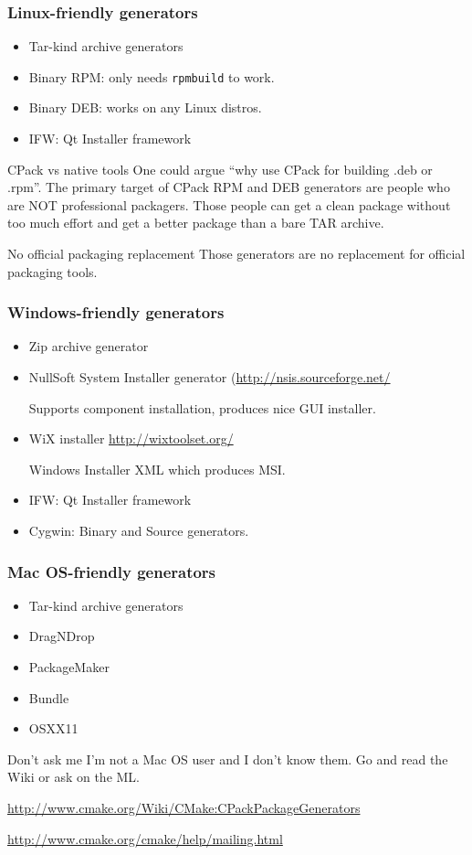 \documentclass[compress,slidestop,table
              ]
               {beamer}
\newcommand{\fname}[1]{\texttt{#1}}
\begin{document}
\begin{frame}
\frametitle{Linux-friendly generators}
\begin{itemize}
\item Tar-kind archive generators
\item Binary RPM: only needs \fname{rpmbuild} to work.
\item Binary DEB: works on any Linux distros.
\item IFW: Qt Installer framework
\end{itemize}
\begin{block}{CPack vs native tools}
One could argue ``why use CPack for building .deb or .rpm''.
The primary target of CPack RPM and DEB generators are people who are NOT
professional packagers.
Those people can get a clean package without too much effort and get
a better package than a bare TAR archive.
\end{block}
\begin{alertblock}{No official packaging replacement}
Those generators are \alert{no replacement} for official packaging tools.
\end{alertblock}
\end{frame}

\begin{frame}
\frametitle{Windows-friendly generators}
\begin{itemize}
\item Zip archive generator
\item NullSoft System Installer generator (\url{http://nsis.sourceforge.net/}

      Supports component installation, produces nice GUI installer.
\item WiX installer \url{http://wixtoolset.org/}

  Windows Installer XML which produces MSI.
\item IFW: Qt Installer framework
\item Cygwin: Binary and Source generators.
\end{itemize}
\end{frame}

\begin{frame}
\frametitle{Mac OS-friendly generators}
\begin{multicols}{2}
\begin{itemize}
\item Tar-kind archive generators
\item DragNDrop
\item PackageMaker
\item Bundle
\item OSXX11
\end{itemize}
\end{multicols}
\begin{alertblock}{Don't ask me}
I'm not a Mac OS user and I don't know them.
Go and read the Wiki or ask on the ML.

\url{http://www.cmake.org/Wiki/CMake:CPackPackageGenerators}

\url{http://www.cmake.org/cmake/help/mailing.html}
\end{alertblock}
\end{frame}
\end{document}
